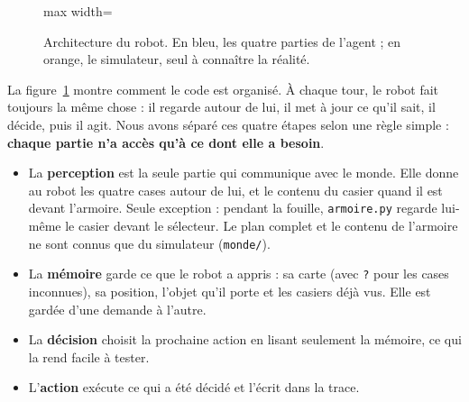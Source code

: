 \documentclass[11pt,a4paper]{article}
\newcommand{\code}[1]{\texttt{#1}}
\begin{document}
\begin{figure}[h]
\begin{adjustbox}{max width=\textwidth}
\end{adjustbox}
\caption{Architecture du robot. En bleu, les quatre parties de l'agent ; en orange, le simulateur, seul à connaître la réalité.}
\label{fig:archi}
\end{figure}

La figure~\ref{fig:archi} montre comment le code est organisé. À chaque tour, le robot fait toujours la même chose : il regarde autour de lui, il met à jour ce qu'il sait, il décide, puis il agit. Nous avons séparé ces quatre étapes selon une règle simple : \textbf{chaque partie n'a accès qu'à ce dont elle a besoin}.
\begin{itemize}
  \item La \textbf{perception} est la seule partie qui communique avec le monde. Elle donne au robot les quatre cases autour de lui, et le contenu du casier quand il est devant l'armoire. Seule exception : pendant la fouille, \code{armoire.py} regarde lui-même le casier devant le sélecteur. Le plan complet et le contenu de l'armoire ne sont connus que du simulateur (\code{monde/}).
  \item La \textbf{mémoire} garde ce que le robot a appris : sa carte (avec \code{?} pour les cases inconnues), sa position, l'objet qu'il porte et les casiers déjà vus. Elle est gardée d'une demande à l'autre.
  \item La \textbf{décision} choisit la prochaine action en lisant seulement la mémoire, ce qui la rend facile à tester.
  \item L'\textbf{action} exécute ce qui a été décidé et l'écrit dans la trace.
\end{itemize}
\end{document}
